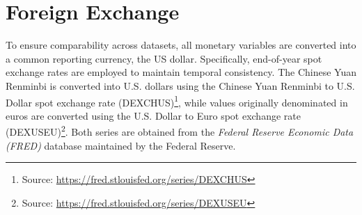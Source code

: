 \section{Foreign Exchange}

To ensure comparability across datasets, all monetary variables are converted into a common reporting currency, the US dollar. Specifically, end-of-year spot exchange rates are employed to maintain temporal consistency. The Chinese Yuan Renminbi is converted into U.S. dollars using the Chinese Yuan Renminbi to U.S. Dollar spot exchange rate (DEXCHUS)\footnote{Source: \url{https://fred.stlouisfed.org/series/DEXCHUS}}, while values originally denominated in euros are converted using the U.S. Dollar to Euro spot exchange rate (DEXUSEU)\footnote{Source: \url{https://fred.stlouisfed.org/series/DEXUSEU}}. Both series are obtained from the \textit{Federal Reserve Economic Data (FRED)} database maintained by the Federal Reserve.